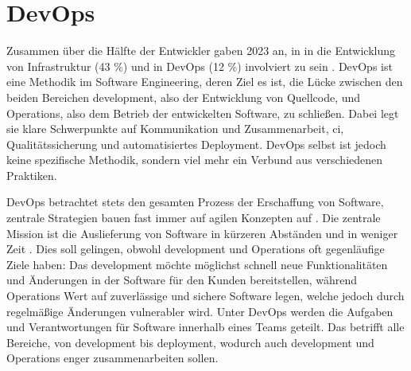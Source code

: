 \section{DevOps}
\label{sec:03-01_devops}

Zusammen über die Hälfte der Entwickler gaben 2023 an, in in die Entwicklung von Infrastruktur (43 \%) und in DevOps (12 \%) involviert zu sein \cite{207:Developer-Ecosystem}. DevOps ist eine Methodik im Software Engineering, deren Ziel es ist, die Lücke zwischen den beiden Bereichen \Gls{development}, also der Entwicklung von Quellcode, und Operations, also dem Betrieb der entwickelten Software, zu schließen. Dabei legt sie klare Schwerpunkte auf Kommunikation und Zusammenarbeit, \acrlong{ci}, Qualitätssicherung und automatisiertes Deployment. DevOps selbst ist jedoch keine spezifische Methodik, sondern viel mehr ein Verbund aus verschiedenen Praktiken. \cite{001:DevOps-Adoption-in-Software-Development}

DevOps betrachtet stets den gesamten Prozess der Erschaffung von Software, zentrale Strategien bauen fast immer auf agilen Konzepten auf \cite{001:DevOps-Adoption-in-Software-Development}. Die zentrale Mission ist die Auslieferung von Software in kürzeren Abständen und in weniger Zeit \cite{006:Prevalence-of-GitOps-DevOps-in-Fast-CI-CD-Cycles}. Dies soll gelingen, obwohl \Gls{development} und Operations oft gegenläufige Ziele haben: Das \Gls{development} möchte möglichst schnell neue Funktionalitäten und Änderungen in der Software für den Kunden bereitstellen, während Operations Wert auf zuverlässige und sichere Software legen, welche jedoch durch regelmäßige Änderungen vulnerabler wird. Unter DevOps werden die Aufgaben und Verantwortungen für Software innerhalb eines Teams geteilt. Das betrifft alle Bereiche, von \Gls{development} bis \Gls{deployment}, wodurch auch \Gls{development} und Operations enger zusammenarbeiten sollen. \cite{000:CI-CD-Deployment-in-DevOps-reduce-Gap-Developer-Operation}

